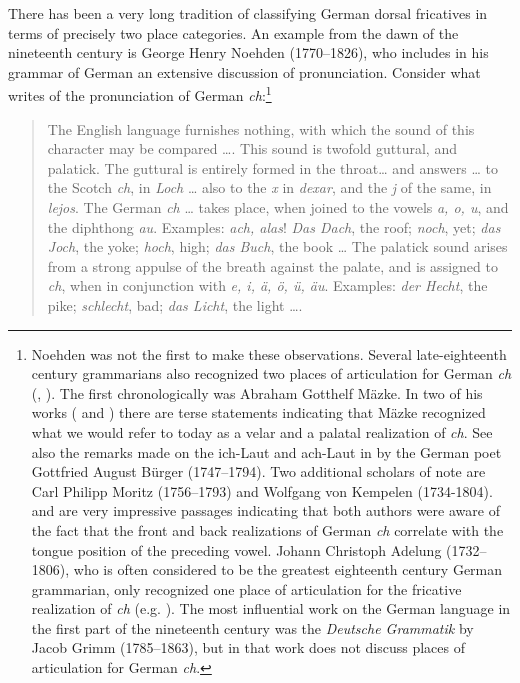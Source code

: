 There has been a very long tradition of classifying German dorsal fricatives in terms of precisely two place categories. An example from the dawn of the nineteenth century is George Henry Noehden (1770--1826), who includes in his grammar of German an extensive discussion of pronunciation. Consider what \citet[62--63]{Noehden1800} writes of the pronunciation of German \textit{ch}:\footnote{Noehden was not the first to make these observations. Several late-eighteenth century grammarians also recognized two places of articulation for German \textit{ch} (\citealt[19--20]{Jellinek1914}, \citealt[113]{Voge1978}). The  first chronologically was Abraham Gotthelf Mäzke. In two of his works (\citealt[171]{Mäzke1776} and \citealt[27]{Mäzke1780}) there are terse statements indicating that Mäzke recognized what we would refer to today as a velar and a palatal realization of \textit{ch}. See also the remarks made on the ich-Laut and ach-Laut in \citet[128--131]{Bürger1798} by the German poet Gottfried August Bürger (1747--1794). Two additional scholars of note are Carl Philipp Moritz (1756--1793) and Wolfgang von Kempelen (1734-1804). \citet[23--24]{Moritz1784} and \citet[279--285]{vonKempelen1791} are very impressive passages indicating that both authors were aware of the fact that the front and back realizations of German \textit{ch} correlate with the tongue position of the preceding vowel. Johann Christoph Adelung (1732--1806), who is often considered to be the greatest eighteenth century German grammarian, only recognized one place of articulation for the fricative realization of \textit{ch} (e.g. \citealt{Adelung1781}). The most influential work on the German language in the first part of the nineteenth century was the \textit{Deutsche Grammatik} by Jacob Grimm (1785--1863), but in that work \citet[528]{Grimm1821} does not discuss places of articulation for German \textit{ch}.}

\begin{quote}
The English language furnishes nothing, with which the sound of this character may be compared …. This sound is twofold guttural, and palatick. The guttural is entirely formed in the throat… and answers … to the Scotch \textit{ch}, in \textit{Loch} … also to the  \textit{x} in \textit{dexar}, and the \textit{j} of the same, in \textit{lejos}. The German \textit{ch} … takes place, when joined to the vowels \textit{a, o, u}, and the diphthong \textit{au}. Examples: \textit{ach, alas}! \textit{Das Dach}, the roof; \textit{noch}, yet; \textit{das Joch}, the yoke; \textit{hoch}, high; \textit{das Buch}, the book … The palatick sound arises from a strong appulse of the breath against the palate, and is assigned to \textit{ch}, when in conjunction with \textit{e, i, ä, ö, ü, äu}. Examples: \textit{der Hecht}, the pike; \textit{schlecht}, bad; \textit{das Licht}, the light ….
\end{quote}

